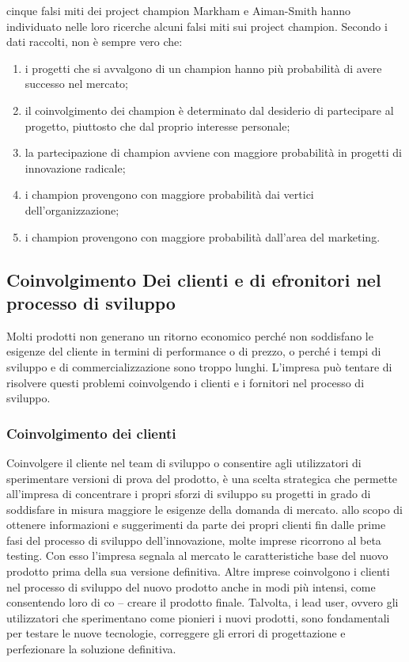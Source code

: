 \documentclass{article}
\begin{document}
cinque falsi miti dei project champion
Markham e Aiman-Smith hanno individuato nelle loro ricerche alcuni
falsi miti sui project champion. Secondo i dati raccolti, non è sempre
vero che:
\begin{enumerate}
	\item i progetti che si avvalgono di un champion hanno più
	probabilità di avere successo nel mercato;
	\item il coinvolgimento dei champion è determinato dal desiderio di
	partecipare al progetto, piuttosto che dal proprio interesse
	personale;
	\item la partecipazione di champion avviene con maggiore
	probabilità in progetti di innovazione radicale;
	\item i champion provengono con maggiore probabilità dai vertici
	dell’organizzazione;
	\item i champion provengono con maggiore probabilità dall’area
	del marketing.
\end{enumerate}

\subsection{Coinvolgimento Dei clienti e di efronitori nel processo di sviluppo}
Molti prodotti non generano un ritorno economico perché non soddisfano le esigenze del cliente
in termini di performance o di prezzo, o perché i tempi di sviluppo e di commercializzazione sono
troppo lunghi. L’impresa può tentare di risolvere questi problemi coinvolgendo i clienti e i fornitori
nel processo di sviluppo.

\subsubsection{Coinvolgimento dei clienti}
Coinvolgere il cliente nel team di sviluppo o consentire agli utilizzatori di sperimentare versioni di
prova del prodotto, è una scelta strategica che permette all’impresa di concentrare i propri sforzi
di sviluppo su progetti in grado di soddisfare in misura maggiore le esigenze della domanda di
mercato. allo scopo di ottenere informazioni e suggerimenti da parte dei propri clienti fin dalle
prime fasi del processo di sviluppo dell’innovazione, molte imprese ricorrono al beta testing. Con
esso l’impresa segnala al mercato le caratteristiche base del nuovo prodotto prima della sua
versione definitiva. Altre imprese coinvolgono i clienti nel processo di sviluppo del nuovo prodotto
anche in modi più intensi, come consentendo loro di co – creare il prodotto finale. Talvolta, i lead
user, ovvero gli utilizzatori che sperimentano come pionieri i nuovi prodotti, sono fondamentali
per testare le nuove tecnologie, correggere gli errori di progettazione e perfezionare la soluzione
definitiva.
\end{document}
